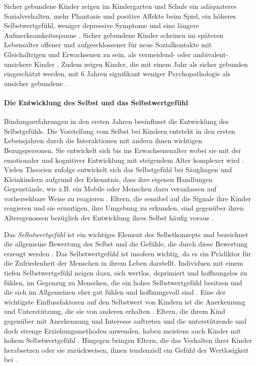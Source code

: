 Sicher gebundene Kinder zeigen im Kindergarten und Schule ein adäquateres Sozialverhalten, mehr Phantasie und positive Affekte beim Spiel, ein höheres Selbstwertgefühl, weniger depressive Symptome und eine längere Aufmerksamkeitsspanne \cite{Dornes1993, Zeanah1994}. Sicher gebundene Kinder scheinen im späteren Lebensalter offener und aufgeschlossener für neue Sozialkontakte mit Gleichaltrigen und Erwachsenen zu sein, als vermeidend- oder ambivalent-unsichere Kinder \cite{Resch1999}. Zudem zeigen Kinder, die mit einem Jahr als sicher gebunden eingeschätzt werden, mit 6 Jahren signifikant weniger Psychopathologie als unsicher gebundene \cite{Lewis1984}.

\paragraph{Die Entwicklung des Selbst und das Selbstwertgefühl}\label{par:EntwSelbst}
Bindungserfahrungen in den ersten Jahren beeinflusst die Entwicklung des Selbstgefühls. Die Vorstellung vom Selbst bei Kindern entsteht in den ersten Lebensjahren durch die Interaktionen mit andern ihnen wichtigen Bezugspersonen. Sie entwickelt sich bis ins Erwachsenenalter wobei sie mit der emotionaler und kognitiver Entwicklung mit steigendem Alter komplexer wird \cite[S.~602ff]{Siegler2008}. Vielen Theorien zufolge entwickelt sich das Selbstgefühl bei Säuglingen und Kleinkindern aufgrund der Erkenntnis, dass ihre eigenen Handlungen Gegenstände, wie z.B. ein Mobile oder Menschen dazu veranlassen auf vorhersehbare Weise zu reagieren \cite{Harter1998}. Eltern, die sensibel auf die Signale ihre Kinder reagieren und sie ermutigen, ihre Umgebung zu erkunden, sind gegenüber ihren Altersgenossen bezüglich der Entwicklung ihres Selbst häufig voraus \cite{Pipp1992}. 

Das \textit{Selbstwertgefühl} ist ein wichtiges Element des Selbstkonzepts und bezeichnet die allgemeine Bewertung des Selbst und die Gefühle, die durch diese Bewertung erzeugt werden \cite{Crocker2001}. Das Selbstwertgefühl ist insofern wichtig, da es ein Prädiktor für die Zufriedenheit der Menschen in ihrem Leben darstellt. Individuen mit einem tiefen Selbstwertgefühl neigen dazu, sich wertlos, deprimiert und hoffnungslos zu fühlen, im Gegenzug zu Menschen, die ein hohes Selbstwertgefühl besitzen und die sich im Allgemeinen eher gut fühlen und hoffnungsvoll sind \cite{Harter1999}. Eine der wichtigste Einflussfaktoren auf den Selbstwert von Kindern ist die Anerkennung und Unterstützung, die sie von anderen erhalten \cite{Siegler2008}. Eltern, die ihrem Kind gegenüber mit Anerkennung und Interesse auftreten und die unterstützende und doch strenge Erziehungsmethoden anwenden, haben meistens auch Kinder mit hohem Selbstwertgefühl \cite{Feiring1996}. Hingegen bringen Eltern, die das Verhalten ihrer Kinder herabsetzen oder sie zurückweisen, ihnen tendenziell ein Gefühl der Wertlosigkeit bei \cite{Harter1999}. 

